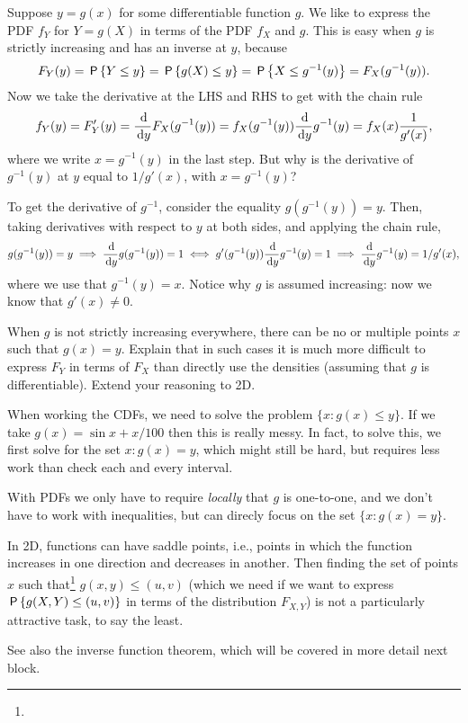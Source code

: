 \begin{exercise}
Suppose $y=g(x)$ for some differentiable function $g$. We like to express the PDF $f_{Y}$ for $Y=g(X)$ in terms of the PDF $f_X$ and $g$.
This is easy  when $g$ is strictly increasing and has an inverse at $y$, because
\begin{align}\label{eq:1D-CDF}
F_{Y}(y) = \P{Y\leq y} = \P{g(X) \leq y} = \P{X\leq g^{-1}(y)} = F_X(g^{-1}(y)).
\end{align}
Now we  take the derivative at the LHS and RHS to get with the chain rule
\begin{align*}
f_{Y}(y) = F_{Y}'(y) = \frac{\d }{\d y} F_{X}(g^{-1}(y)) = f_{X}(g^{-1}(y)) \frac{\d }{\d y} g^{-1}(y) = f_{X}(x) \frac{1}{g'(x)},
\end{align*}
where we write $x=g^{-1}(y)$ in the last step.
But why is the derivative of $g^{-1}(y)$ at $y$ equal to $1/g'(x)$, with $x=g^{-1}(y)$?
\begin{solution}
To get the derivative of $g^{-1}$, consider the equality $g(g^{-1}(y)) = y$. Then, taking derivatives with respect to $y$ at both sides, and  applying the chain rule,
\begin{align*}
g(g^{-1}(y)) = y \implies \frac{\d}{\d y} g(g^{-1}(y)) =1 \iff g'(g^{-1}(y)) \frac{\d}{\d y} g^{-1}(y) = 1 \implies  \frac{\d}{\d y} g^{-1}(y)  = 1 /g'(x),
\end{align*}
where we use that $g^{-1}(y)=x$. Notice why $g$ is assumed increasing: now we know that $g'(x)\neq0$.
\end{solution}
\end{exercise}



\begin{exercise}
When $g$ is not strictly increasing everywhere, there can be no or multiple points $x$ such that $g(x)=y$.
Explain that in such cases it is much more difficult to  express $F_Y$ in terms of $F_X$ than directly use the densities (assuming that $g$ is differentiable).  Extend your reasoning to 2D.
\begin{solution}
When working the CDFs, we need to solve the problem $\{x : g(x) \leq y\}$. If we take $g(x) = \sin x + x/100$ then this is really messy. In fact, to solve this, we first solve for the set ${x : g(x) = y}$, which might still be hard, but requires less work than check each and every interval.

With PDFs  we only have to require \emph{locally} that $g$ is one-to-one, and we don't have to work with inequalities, but can direcly focus on the set $\{x : g(x) = y\}$.

In 2D,  functions can have saddle points, i.e., points in which the function increases in one direction and decreases in another.
Then finding the set of points $x$ such that\footnote{} $g(x,y)\leq (u,v)$ (which we need if we want to express $\P{g(X, Y) \leq (u,v)}$ in terms of the distribution $F_{X,Y}$) is not a particularly attractive task, to say the least.

See also the inverse function theorem, which will be covered in more detail next block.
\end{solution}
\end{exercise}


